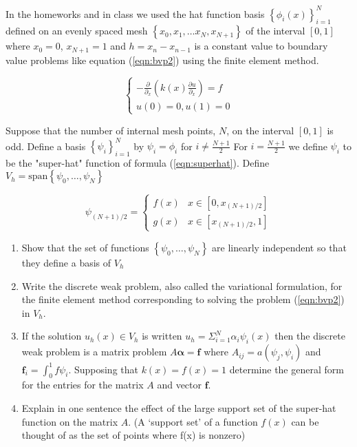 In the homeworks and in class we used the hat function basis $\left\{ \phi_{i}(x) \right\}_{i=1}^{N}$ defined on an evenly
spaced mesh $\left\{  x_0, x_1, \ldots x_N, x_{N+1}  \right\}$ of the interval $[0,1]$ where $x_0=0$, $x_{N+1}=1$ and $h = x_n - x_{n-1}$ is a constant value to boundary value problems like equation (\ref{eqn:bvp2}) using the finite element method. 
 
\begin{equation}\label{eqn:bvp2}
 \left\{
     \begin{array}{c}
       -\frac{\partial}{\partial_x}\left( k(x) \frac{\partial u}{\partial_x}\right) = f\\
       u(0) = 0, u(1) = 0
     \end{array}
   \right.
\end{equation}

Suppose that the number of internal mesh points, $N$, on the interval $[0,1]$ is odd. Define a basis $\left\{ \psi_{i} \right\}_{i=1}^{N}$ by $\psi_{i} = \phi_{i}$ for $i \neq \frac{N+1}{2}$  For $i = \frac{N+1}{2}$ we define $\psi_{i}$ to be the "super-hat" function of formula (\ref{eqn:superhat}).  Define $V_{h} = \text{span}\left\{\psi_{0},\ldots,\psi_{N}\right\}$

\begin{equation}\label{eqn:superhat}
\psi_{(N+1)/2} = 
\left\{
     \begin{array}{cc}
     f(x) & x \in [0,x_{(N+1)/2}]\\
     g(x) & x\in [ x_{(N+1)/2},1]
     \end{array}
   \right.
\end{equation}



\begin{enumerate}
\item Show that the set of functions $\left\{\psi_{0},\ldots,\psi_{N}\right\}$ are linearly independent so that they define a basis of $V_{h}$

\item Write the discrete weak problem, also called the variational formulation, for the finite element method corresponding to solving the problem (\ref{eqn:bvp2}) in $V_{h}$.

\item If the solution $u_h(x) \in V_h$ is written $u_h = \Sigma_{i=1}^{N} \alpha_{i}\psi_{i}(x)$ then the discrete weak problem is a matrix problem $A\mathbf{\alpha} = \mathbf{f}$ where $A_{ij} = a(\psi_j,\psi_i)$ and $\mathbf{f}_i = \int_{0}^{1}  f \psi_i$.  Supposing that $k(x) = f(x) = 1$ determine the general form for the entries for the matrix $A$ and vector $\mathbf{f}$.

\item Explain in one sentence the effect of the large support set of the super-hat function on the matrix $A$. (A `support set' of a function $f(x)$ can be thought of as the set of points where f(x) is nonzero)



\end{enumerate}



